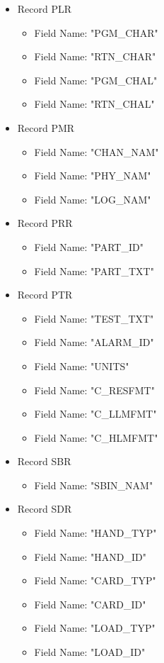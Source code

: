 \documentclass[letterpaper]{article}
\begin{document}
\begin{itemize}
\begin{itemize}
    \end{itemize}
\item Record PLR
    \begin{itemize}
    \item Field Name: "PGM\_CHAR"
    \item Field Name: "RTN\_CHAR"
    \item Field Name: "PGM\_CHAL"
    \item Field Name: "RTN\_CHAL"
    \end{itemize}
\item Record PMR
    \begin{itemize}
    \item Field Name: "CHAN\_NAM"
    \item Field Name: "PHY\_NAM"
    \item Field Name: "LOG\_NAM"
    \end{itemize}
\item Record PRR
    \begin{itemize}
    \item Field Name: "PART\_ID"
    \item Field Name: "PART\_TXT"
    \end{itemize}
\item Record PTR
    \begin{itemize}
    \item Field Name: "TEST\_TXT"
    \item Field Name: "ALARM\_ID"
    \item Field Name: "UNITS"
    \item Field Name: "C\_RESFMT"
    \item Field Name: "C\_LLMFMT"
    \item Field Name: "C\_HLMFMT"
    \end{itemize}
\item Record SBR
    \begin{itemize}
    \item Field Name: "SBIN\_NAM"
    \end{itemize}
\item Record SDR
    \begin{itemize}
    \item Field Name: "HAND\_TYP"
    \item Field Name: "HAND\_ID"
    \item Field Name: "CARD\_TYP"
    \item Field Name: "CARD\_ID"
    \item Field Name: "LOAD\_TYP"
    \item Field Name: "LOAD\_ID"

\end{itemize}
\end{itemize}
\end{document}
